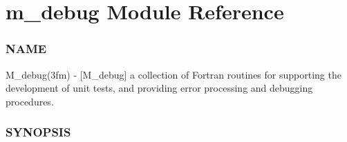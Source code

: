 \hypertarget{namespacem__debug}{}\section{m\+\_\+debug Module Reference}
\label{namespacem__debug}


\subsubsection*{N\+A\+ME}

M\+\_\+debug(3fm) -\/ \mbox{[}M\+\_\+debug\mbox{]} a collection of Fortran routines for supporting the development of unit tests, and providing error processing and debugging procedures. \subsubsection*{S\+Y\+N\+O\+P\+S\+IS} 


